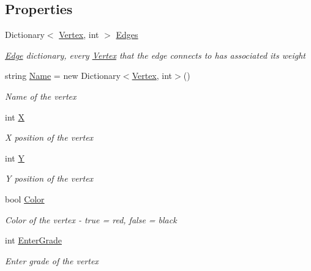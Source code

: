 \subsection*{Properties}
\begin{DoxyCompactItemize}
\item 
Dictionary$<$ \hyperlink{class_graph_1_1_vertex}{Vertex}, int $>$ \hyperlink{class_graph_1_1_vertex_a494371449797e8a7d9c26d6a49922f42}{Edges}
\begin{DoxyCompactList}\small\item\em \hyperlink{class_graph_1_1_edge}{Edge} dictionary, every \hyperlink{class_graph_1_1_vertex}{Vertex} that the edge connects to has associated its weight \end{DoxyCompactList}\item 
string \hyperlink{class_graph_1_1_vertex_aa0cafbcfdc99942d4b3942abf6d21894}{Name} = new Dictionary$<$\hyperlink{class_graph_1_1_vertex}{Vertex}, int$>$()
\begin{DoxyCompactList}\small\item\em Name of the vertex \end{DoxyCompactList}\item 
int \hyperlink{class_graph_1_1_vertex_af2284092cc5f24be9656338f4e2fe80f}{X}
\begin{DoxyCompactList}\small\item\em X position of the vertex \end{DoxyCompactList}\item 
int \hyperlink{class_graph_1_1_vertex_a7166c79bcdc4d67314cd16b456a24dd2}{Y}
\begin{DoxyCompactList}\small\item\em Y position of the vertex \end{DoxyCompactList}\item 
bool \hyperlink{class_graph_1_1_vertex_a06cc9a5a43a8a9fb1715b19a8877ed01}{Color}
\begin{DoxyCompactList}\small\item\em Color of the vertex -\/ true = red, false = black \end{DoxyCompactList}\item 
int \hyperlink{class_graph_1_1_vertex_a63c478ac5624dcd7d424212e1b4fa923}{Enter\+Grade}
\begin{DoxyCompactList}\small\item\em Enter grade of the vertex \end{DoxyCompactList}\end{DoxyCompactItemize}


